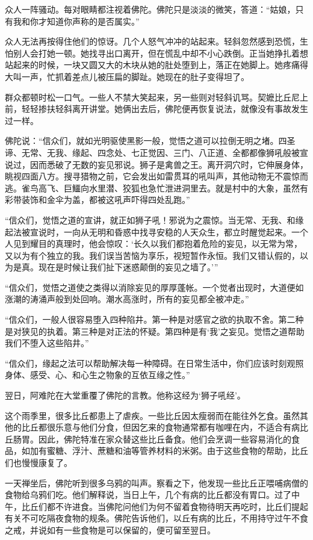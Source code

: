 \documentclass[12pt,twoside,openany]{book}
\begin{document}
众人一阵骚动。每对眼睛都注视着佛陀。佛陀只是淡淡的微笑，答道：“姑娘，只有我和你才知道你声称的是否属实。”

众人无法再按得住他们的惊讶。几个人怒气冲冲的站起来。轻斜忽然感到恐慌，生怕别人会打她一顿。她找寻出口离开，但在慌乱中却不小心跌倒。正当她挣扎着想站起来的时候，一块又圆又大的木块从她的肚处堕到上，落正在她脚上。她疼痛得大叫一声，忙抓着差点儿被压扁的脚趾。她现在的肚子变得坦了。

群众都顿时松一口气。一些人不禁大笑起来，另一些则对轻斜讥骂。契嬷比丘尼上前，轻轻掺扶轻斜离开讲堂。她俩出去后，佛陀便再恢复说法，就像没有事故发生过一样。

佛陀说：“信众们，就如光明驱使黑影一般，觉悟之道可以拉倒无明之堵。四圣谛、无常、无我、缘起、四念处、七正觉因、三门、八正道、全都都像狮吼般被宣说过，因而悉破了无数的妄见邪说。狮子是禽兽之王。离开洞穴时，它伸展身体，眺视四面八方。搜寻猎物之前，它会发出如雷贯耳的吼叫声，其他动物无不震惊而逃。雀鸟高飞、巨鱷向水里潜、狡狐也急忙泄进洞里去。就是村中的大象，虽然有彩带装饰和金伞为盖，都被这吼声吓得四处乱跑。”

“信众们，觉悟之道的宣讲，就正如狮子吼！邪说为之震惊。当无常、无我、和缘起法被宣说时，一向从无明和昏惑中找寻安稳的人天众生，都立时醒觉起来。一个人见到耀目的真理时，他会惊叹：‘长久以我们都抱着危险的妄见，以无常为常，又以为有个独立的我。我们误当苦恼为享乐，视短暂作永恒。我们又错认假的，以为是真。现在是时候让我们扯下迷惑颠倒的妄见之墙了。’”

“信众们，觉悟之道使之类得以消除妄见的厚厚蓬帐。一个觉者出现时，大道便如涨潮的涛涌声般到处回响。潮水高涨时，所有的妄见都全被冲走。”

“信众们，一般人很容易堕入四种陷井。第一种是对感官之欲的执取不舍。第二种是对狭见的执着。第三种是对正法的怀疑。第四种是有‘我’之妄见。觉悟之道帮助我们不堕入这些陷井。”

“信众们，缘起之法可以帮助解决每一种障碍。在日常生活中，你们应该时刻观照身体、感受、心、和心生之物象的互依互缘之性。”

翌日，阿难陀在大堂重覆了佛陀的言教。他称这经为‘狮子吼经’。

这个雨季里，很多比丘都患上了虐疾。一些比丘因太瘦弱而在能往外乞食。虽然其他的比丘都很乐意与他们分食，但因乞来的食物通常都有咖哩在内，不适合有病比丘肠胃。因此，佛陀特准在家众替这些比丘备食。他们会烹调一些容易消化的食品，如加有蜜糖、浮汁、蔗糖和油等管养材料的米粥。由于这些食物的帮助，比丘们也慢慢康复了。

一天禅坐后，佛陀听到很多乌鸦的叫声。察看之下，他发现一些比丘正喂哺病僧的食物给乌鸦们吃。他们解释说，当日上午，几个有病的比丘都没有胃口。过了中午，比丘们都不许进食。当佛陀问他们为何不留着食物待明天再吃时，比丘们提起有关不可吃隔夜食物的规条。佛陀告诉他们，以丘有病的比丘，不用持守过午不食之戒，并说如有一些食物是可以保留的，便可留至翌日。
\end{document}
